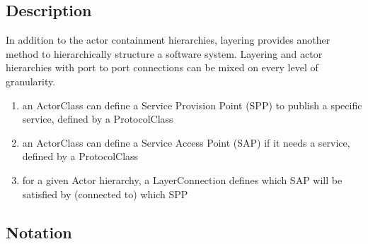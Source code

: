 \subsection{Description}

In addition to the actor containment hierarchies, layering provides another method to hierarchically 
structure a software system. Layering and actor hierarchies with port to port connections can be mixed on 
every level of granularity.
\begin{enumerate}
\item an ActorClass can define a Service Provision Point (SPP) to publish a specific service, defined by a 
ProtocolClass
\item an ActorClass can define a Service Access Point (SAP) if it needs a service, defined by a 
ProtocolClass
\item for a given Actor hierarchy, a LayerConnection defines which SAP will be satisfied by (connected to) 
which SPP
\end{enumerate}

\subsection{Notation}

